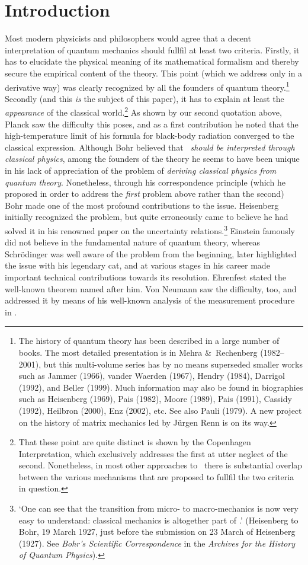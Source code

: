 \documentclass[12pt]{article}
\begin{document}
\section{Introduction}\label{S1}
Most modern physicists and philosophers would agree that a decent interpretation of quantum mechanics should fullfil at least two criteria. Firstly, it has to elucidate  the physical meaning of its mathematical formalism and thereby secure the empirical content of the theory. This point (which we address only in a derivative way) was clearly recognized by all the founders of quantum theory.\footnote{The history of quantum theory has been described in a large number of books. The most detailed presentation is in Mehra \&\ Rechenberg (1982--2001), but this multi-volume series has by no means superseded smaller works such as Jammer (1966),  vander Waerden (1967), Hendry (1984), Darrigol (1992), and Beller (1999). Much information may also be found in biographies such as Heisenberg (1969), Pais (1982), Moore (1989), Pais (1991), Cassidy (1992), Heilbron (2000), Enz (2002), etc. See also Pauli (1979). A new project on the history of matrix mechanics led by J\"{u}rgen Renn is on its way.\label{historybooks}} 
Secondly (and this {\it is}  the subject of this paper), it has to explain at least the {\it appearance} of the classical world.\footnote{That these point are quite distinct is shown by the Copenhagen Interpretation, which exclusively addresses the first at utter neglect of the second. Nonetheless, in most other approaches to \qm\ there is substantial overlap between the various mechanisms that are proposed to fullfil the two criteria in question.}
 As shown by our second quotation above, Planck saw the difficulty this poses, and 
as a first contribution he noted that the high-temperature limit of his formula for black-body radiation converged to the classical expression. 
 Although Bohr believed that {\it \qm\ should be interpreted through classical physics}, among the founders of the theory he seems to have been unique in his lack of appreciation of the problem of {\it deriving classical physics from quantum theory}. Nonetheless, through his correspondence principle (which he proposed in order to address the {\it first} problem above rather than the second) Bohr made one of the most profound contributions to the issue.
Heisenberg initially recognized the problem, but quite erroneously came to believe he had solved it in his renowned paper on the uncertainty relations.\footnote{`One can see that the transition from micro- to macro-mechanics is now very easy to understand: classical mechanics is altogether part of \qm.' (Heisenberg to Bohr, 19 March 1927, just before 
the submission on 23 March of Heisenberg (1927). See {\it Bohr's Scientific Correspondence} in the {\it Archives for the History of Quantum Physics}).}
Einstein famously did not believe in the fundamental nature of quantum theory, whereas Schr\"{o}dinger was well aware of the problem from the beginning, later highlighted the issue with his legendary cat, and at various stages in his career made  important technical contributions towards its resolution. Ehrenfest stated the well-known theorem named after him.  Von Neumann saw the difficulty, too, and addressed it by means of his well-known analysis of the measurement procedure in \qm. 
\end{document}
